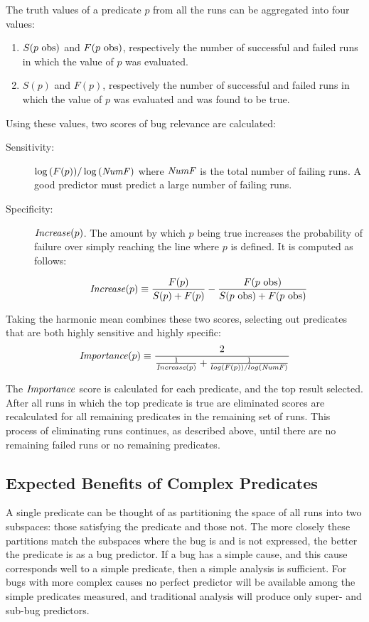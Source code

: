 The truth values of a predicate $p$ from all the runs can be aggregated into four values:

\begin{enumerate}
\item $S(\text{$p$ obs})$ and $F(\text{$p$ obs})$, respectively the number of successful and failed runs in which the value of $p$ was evaluated.
\item $S(p)$ and $F(p)$, respectively the number of successful and failed runs in which the value of $p$ was evaluated and was found to be true.
\end{enumerate}

Using these values, two scores of bug relevance are calculated:
\begin{description}
\item[Sensitivity:] $\log{(F(p))} / \log{(\mathit{NumF})}$ where $\mathit{NumF}$ is the total number of failing runs.  A good predictor must predict a large number of failing runs.
\item[Specificity:] $\mathit{Increase}(p)$.  The amount by which $p$ being true increases the probability of failure over simply reaching the line where $p$ is defined.  It is computed as follows:

  \begin{equation}
    \label{eqn1}
    \mathit{Increase}(p) \equiv
    \frac{F(p)}{S(p) + F(p)}
    -
    \frac{F(\text{$p$ obs})}{S(\text{$p$ obs}) + F(\text{$p$ obs})}
  \end{equation}

\end{description}

Taking the harmonic mean combines these two scores, selecting out predicates that are both highly sensitive and highly specific:
\begin{equation}
\label{eqn2}
\Importance(p) \equiv
\frac{2}{%
  \frac{1}{\Increase(p)}
  +
  \frac{1}{log(F(p)) / log(\NumF)}}
\end{equation}

The $\mathit{Importance}$ score is calculated for each predicate, and the top result selected.  After all runs in which the top predicate is true are eliminated scores are recalculated for all remaining predicates in the remaining set of runs.  This process of eliminating runs continues, as described above, until there are no remaining failed runs or no remaining predicates.

\subsection{Expected Benefits of Complex Predicates}
A single predicate can be thought of as partitioning the space of all runs into two subspaces: those satisfying the predicate and those not.  The more closely these partitions match the subspaces where the bug is and is not expressed, the better the predicate is as a bug predictor.  If a bug has a simple cause, and this cause corresponds well to a simple predicate, then a simple analysis is sufficient.  For bugs with more complex causes no perfect predictor will be available among the simple predicates measured, and traditional analysis will produce only super- and sub-bug predictors.

